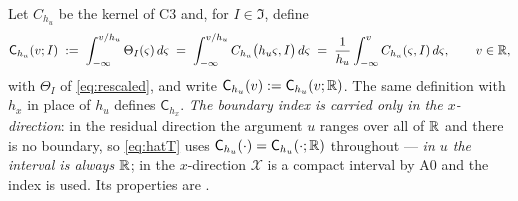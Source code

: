 %

%

\begin{definition}\label{def:intker}
Let $C_{h_u}$ be the kernel of C3 and, for $I\in\mathfrak I$, define
\begin{equation}\label{eq:intker}
\mathsf C_{h_u}(v;I)\;:=\;\int_{-\infty}^{v/h_u}\Theta_{I}(\varsigma)\,d\varsigma
\;=\;\int_{-\infty}^{v/h_u}C_{h_u}\big(h_u\varsigma,I\big)\,d\varsigma
\;=\;\frac1{h_u}\int_{-\infty}^{v}C_{h_u}(\varsigma,I)\,d\varsigma ,
\qquad v\in\mathbb{R} ,
\end{equation}
with $\Theta_{I}$ of \eqref{eq:rescaled}, and write $\mathsf C_{h_u}(v):=\mathsf C_{h_u}(v;\mathbb{R})$. The same definition with $h_x$ in place of $h_u$
defines $\mathsf C_{h_x}$. \emph{The boundary index is carried only in the $x$-direction}: in the
residual direction the argument $u$ ranges over all of $\mathbb{R}$ and there is no boundary, so
\eqref{eq:hatT} uses $\mathsf C_{h_u}(\cdot)=\mathsf C_{h_u}(\cdot;\mathbb{R})$ throughout --- \emph{in $u$ the
interval is always $\mathbb{R}$}; in the
$x$-direction $\mathcal X$ is a compact interval by A0 and the index is used.
Its properties are .
\end{definition}

